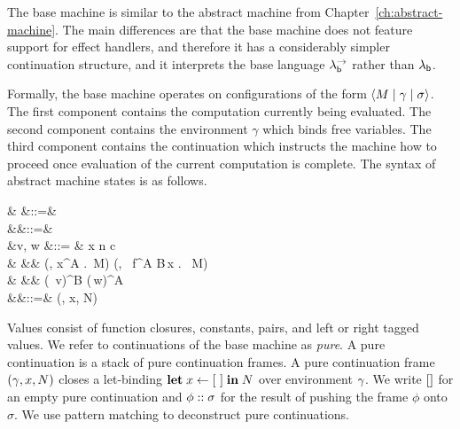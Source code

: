 \documentclass[12pt,phd,lfcs,twoside,openright,logo,leftchapter,normalheadings]{infthesis}
\theoremstyle{plain}
\theoremstyle{definition}
\begin{document}
The base machine is similar to the abstract machine from
Chapter~\ref{ch:abstract-machine}. The main differences are that the
base machine does not feature support for effect handlers, and
therefore it has a considerably simpler continuation structure, and it
interprets the base language $\lambda^\rightarrow_{\mathsf{b}}$ rather than $\lambda_{\mathsf{b}}$.

Formally, the base machine operates on configurations of the form
$\langle M \mid \gamma \mid \sigma \rangle$. The first component contains the
computation currently being evaluated. The second component contains
the environment $\gamma$ which binds free variables. The third
component contains the continuation which instructs the machine how to
proceed once evaluation of the current computation is complete.
%
The syntax of abstract machine states is as follows.
{
\begin{syntax}
           & \conf \in \Conf  &::=&  \\
       &\env \in \Env   &::=& \emptyset \mid \env[x \mapsto v] \\
 &v, w \in \MValCat  &::= & x \mid n \mid c \mid \Unit \mid {} \\
                                &                &\mid& (\env, \lambda x^A .\, M) \mid (\env, \Rec\, f^{A \to B}\,x . \, M)\\
                                &                &\mid&  (\Inl\, v)^B \mid (\Inr\,w)^A \\
  &\sigma \in \MPContCat &::=& \nil \mid (\env, x, N) \cons \sigma \\
\end{syntax}}%
%
Values consist of function closures, constants, pairs, and left or
right tagged values.
%
We refer to continuations of the base machine as \emph{pure}.
%
A pure continuation is a stack of pure continuation frames. A pure
continuation frame $(\gamma, x, N)$ closes a let-binding $\mathbf{let} \;x
\leftarrow [~] \;\mathbf{in}\;N$ over environment $\gamma$.
%
We write $[]$ for an empty pure continuation and $\phi :: \sigma$
for the result of pushing the frame $\phi$ onto $\sigma$. We use
pattern matching to deconstruct pure continuations.
%
\end{document}
